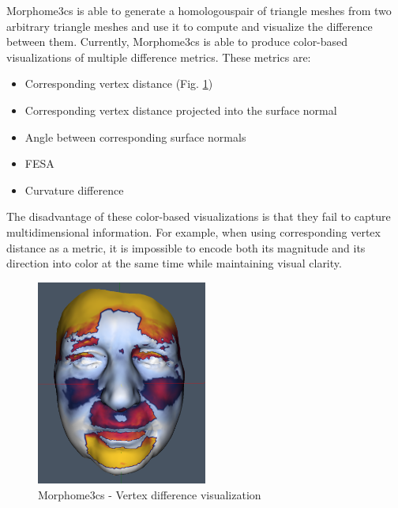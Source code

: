 Morphome3cs is able to generate a homologous\footnotemark pair of triangle meshes from two arbitrary triangle meshes and use it to compute and visualize the difference between them. Currently, Morphome3cs is able to produce color-based visualizations of multiple difference metrics. These metrics are:


\begin{itemize}
\item Corresponding vertex distance (Fig. \ref{fig:morpho_example})
\item Corresponding vertex distance projected into the surface normal
\item Angle between corresponding surface normals
\item FESA\footnotemark
\item Curvature difference
\end{itemize}


The disadvantage of these color-based visualizations is that they fail to capture multidimensional information. For example, when using corresponding vertex distance as a metric, it is impossible to encode both its magnitude and its direction into color at the same time while maintaining visual clarity.

\begin{figure}[h]
\centering
\includegraphics[width=0.5\textwidth]{./img/morpho-example01.PNG}
\caption[Morphome3cs - Vertex difference visualization]{Morphome3cs - Vertex difference visualization}
\label{fig:morpho_example}
\end{figure}

